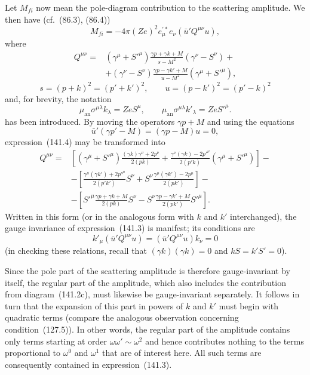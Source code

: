 Let $M_{fi}$ now mean the pole-diagram contribution to the scattering amplitude. We then have (cf.~(86.3), (86.4))
\begin{equation}
M_{fi}=-4\pi(Ze)^2e_\mu^{\prime *}e_\nu(\bar u'Q^{\mu\nu}u),
\tag{141.3}
\end{equation}
where
\begin{equation}
\begin{aligned}
Q^{\mu\nu}={}&(\gamma^\mu+S'^{\mu})
\frac{\gamma p+\gamma k+M}{s-M^2}(\gamma^\nu-S^\nu)+{}\\
&+(\gamma^\nu-S^\nu)
\frac{\gamma p-\gamma k'+M}{u-M^2}(\gamma^\mu+S'^{\mu}),
\end{aligned}
\tag{141.4}
\end{equation}
\[
s=(p+k)^2=(p'+k')^2,\qquad
u=(p-k')^2=(p'-k)^2
\]
and, for brevity, the notation
\begin{equation}
\mu_{\text{an}}\sigma^{\mu\lambda}k_\lambda=ZeS^\mu,
\qquad
\mu_{\text{an}}\sigma^{\mu\lambda}k'_\lambda=ZeS'^{\mu}.
\tag{141.5}
\end{equation}
has been introduced. By moving the operators $\gamma p+M$ and using the equations
\[
\bar u'(\gamma p'-M)=(\gamma p-M)u=0,
\]
expression~(141.4) may be transformed into
\begin{equation}
\begin{aligned}
Q^{\mu\nu}={}&\left[(\gamma^\mu+S'^{\mu})
\frac{(\gamma k)\gamma^\nu+2p^\nu}{2(pk)}
+\frac{\gamma^\nu(\gamma k)-2p'^\nu}{2(p'k)}
(\gamma^\mu+S'^{\mu})\right]-{}\\
&-\left[\frac{\gamma^\mu(\gamma k')+2p'^\mu}{2(p'k')}S^\nu
+S^\nu\frac{\gamma^\mu(\gamma k')-2p^\mu}{2(pk')}\right]-{}\\
&-\left[S'^{\mu}\frac{\gamma p+\gamma k+M}{2(pk)}S^\nu
-S^\nu\frac{\gamma p-\gamma k'+M}{2(pk')}S'^{\mu}\right].
\end{aligned}
\tag{141.6}
\end{equation}
Written in this form (or in the analogous form with $k$ and $k'$ interchanged), the gauge invariance of expression~(141.3) is manifest; its conditions are
\begin{equation}
k'_\mu(\bar u'Q^{\mu\nu}u)=(\bar u'Q^{\mu\nu}u)k_\nu=0
\tag{141.7}
\end{equation}
(in checking these relations, recall that $(\gamma k)(\gamma k)=0$ and $kS=k'S'=0$).

Since the pole part of the scattering amplitude is therefore gauge-invariant by itself, the regular part of the amplitude, which also includes the contribution from diagram~(141.2c), must likewise be gauge-invariant separately. It follows in turn that the expansion of this part in powers of $k$ and $k'$ must begin with quadratic terms (compare the analogous observation concerning condition~(127.5)). In other words, the regular part of the amplitude contains only terms starting at order $\omega\omega'\sim\omega^2$ and hence contributes nothing to the terms proportional to $\omega^0$ and $\omega^1$ that are of interest here. All such terms are consequently contained in expression~(141.3).

